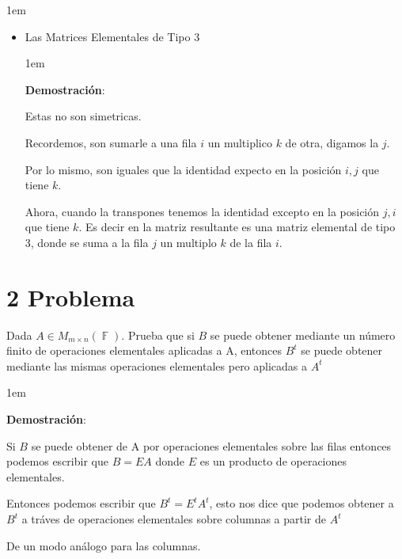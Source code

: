 \documentclass[12pt, fleqn]{article}                             %
\newenvironment{SmallIndentation}[1][0.75em]                    %
        {\begin{adjustwidth}{#1}{}\begin{footnotesize}}             %
        {\end{footnotesize}\end{adjustwidth}}                       %
\theoremstyle{break}                                            %
\DeclareMathOperator \GenericField {\mathbb{F}}                 %
\begin{document}
\begin{SmallIndentation}[1em]
\begin{itemize}
                    

            \item
                Las Matrices Elementales de Tipo 3

                \begin{SmallIndentation}[1em]
                    \textbf{Demostración}:
                    
                    Estas no son simetricas.

                    Recordemos, son sumarle a una fila $i$ un multiplico $k$ de otra, digamos la $j$.

                    Por lo mismo, son iguales que la identidad expecto en la posición $i, j$ que tiene $k$.

                    Ahora, cuando la transpones tenemos la identidad excepto en la posición $j, i$ que tiene $k$.
                    Es decir en la matriz resultante es una matriz elemental de tipo 3, donde se suma a la fila
                    $j$ un multiplo $k$ de la fila $i$.
                
                \end{SmallIndentation}

        \end{itemize}
    
    \end{SmallIndentation}
            

\clearpage
\section{2 Problema}
                            
    Dada $A \in M_{m \times n} (\GenericField)$. Prueba que si $B$ se puede obtener mediante un
    número finito de operaciones elementales aplicadas a A, entonces $B^t$
    se puede obtener mediante las mismas operaciones elementales pero
    aplicadas a $A^t$

    \begin{SmallIndentation}[1em]
        \textbf{Demostración}:
        
        Si $B$ se puede obtener de A por operaciones elementales sobre las filas entonces
        podemos escribir que $B = EA$ donde $E$ es un producto de operaciones elementales.

        Entonces podemos escribir que $B^t = E^t A^t$, esto nos dice que podemos obtener 
        a $B^t$ a tráves de operaciones elementales sobre columnas a partir de $A^t$

        De un modo análogo para las columnas.
    
    \end{SmallIndentation}
     
\end{document}
